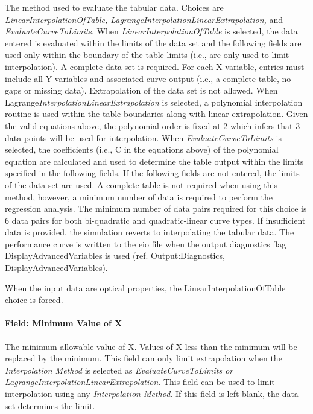 The method used to evaluate the tabular data. Choices are \emph{LinearInterpolationOfTable, LagrangeInterpolationLinearExtrapolation,} and \emph{EvaluateCurveToLimits}. When \emph{LinearInterpolationOfTable} is selected, the data entered is evaluated within the limits of the data set and the following fields are used only within the boundary of the table limits (i.e., are only used to limit interpolation). A complete data set is required. For each X variable, entries must include all Y variables and associated curve output (i.e., a complete table, no gaps or missing data). Extrapolation of the data set is not allowed. When Lagrange\emph{InterpolationLinearExtrapolation} is selected, a polynomial interpolation routine is used within the table boundaries along with linear extrapolation. Given the valid equations above, the polynomial order is fixed at 2 which infers that 3 data points will be used for interpolation. When \emph{EvaluateCurveToLimits} is selected, the coefficients (i.e., C in the equations above) of the polynomial equation are calculated and used to determine the table output within the limits specified in the following fields. If the following fields are not entered, the limits of the data set are used. A complete table is not required when using this method, however, a minimum number of data is required to perform the regression analysis. The minimum number of data pairs required for this choice is 6 data pairs for both bi-quadratic and quadratic-linear curve types. If insufficient data is provided, the simulation reverts to interpolating the tabular data. The performance curve is written to the eio file when the output diagnostics flag DisplayAdvancedVariables is used (ref. \hyperref[outputdiagnostics]{Output:Diagnostics}, DisplayAdvancedVariables).

When the input data are optical properties, the LinearInterpolationOfTable choice is forced.

\paragraph{Field: Minimum Value of X}\label{field-minimum-value-of-x-1-000}

The minimum allowable value of X. Values of X less than the minimum will be replaced by the minimum. This field can only limit extrapolation when the \emph{Interpolation Method} is selected as \emph{EvaluateCurveToLimits or LagrangeInterpolationLinearExtrapolation}. This field can be used to limit interpolation using any \emph{Interpolation Method}. If this field is left blank, the data set determines the limit.

